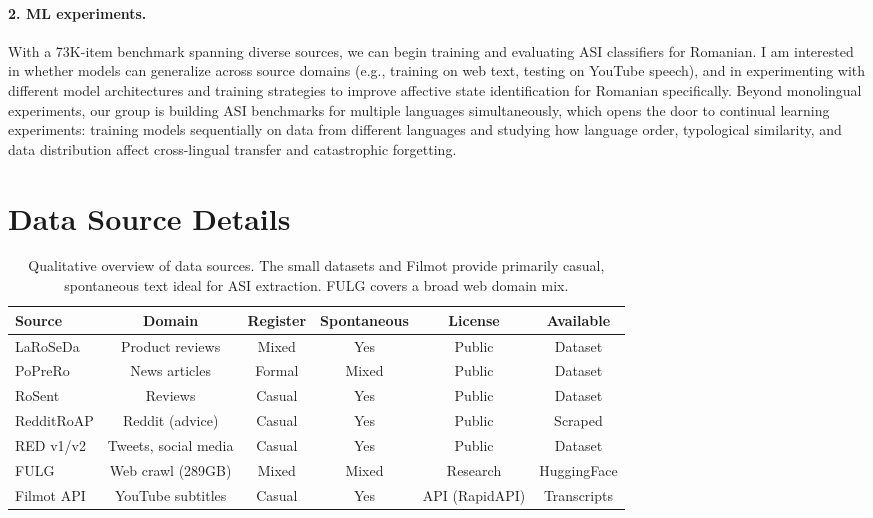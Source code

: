 \documentclass[11pt]{article}
\begin{document}
\paragraph{2. ML experiments.}
With a 73K-item benchmark spanning diverse sources, we can begin training and evaluating ASI classifiers for Romanian. I am interested in whether models can generalize across source domains (e.g., training on web text, testing on YouTube speech), and in experimenting with different model architectures and training strategies to improve affective state identification for Romanian specifically. Beyond monolingual experiments, our group is building ASI benchmarks for multiple languages simultaneously, which opens the door to continual learning experiments: training models sequentially on data from different languages and studying how language order, typological similarity, and data distribution affect cross-lingual transfer and catastrophic forgetting.




\appendix

\section{Data Source Details}

\begin{table}[htbp]
    \centering
    \begin{tabular}{lccccc}
        \toprule
        Source & Domain & Register & Spontaneous & License & Available \\
        \midrule
        LaRoSeDa \cite{laroseda2021} & Product reviews & Mixed & Yes & Public & Dataset \\
        PoPreRo \cite{poprero2022} & News articles & Formal & Mixed & Public & Dataset \\
        RoSent \cite{rosent2022} & Reviews & Casual & Yes & Public & Dataset \\
        RedditRoAP & Reddit (advice) & Casual & Yes & Public & Scraped \\
        RED v1/v2 \cite{red2022} & Tweets, social media & Casual & Yes & Public & Dataset \\
        FULG \cite{fulg2024} & Web crawl (289GB) & Mixed & Mixed & Research & HuggingFace \\
        Filmot API & YouTube subtitles & Casual & Yes & API (RapidAPI) & Transcripts \\
        \bottomrule
    \end{tabular}
    \caption{Qualitative overview of data sources. The small datasets and Filmot provide primarily casual, spontaneous text ideal for ASI extraction. FULG covers a broad web domain mix.}
    \label{tab:qual-data}
\end{table}
\end{document}
